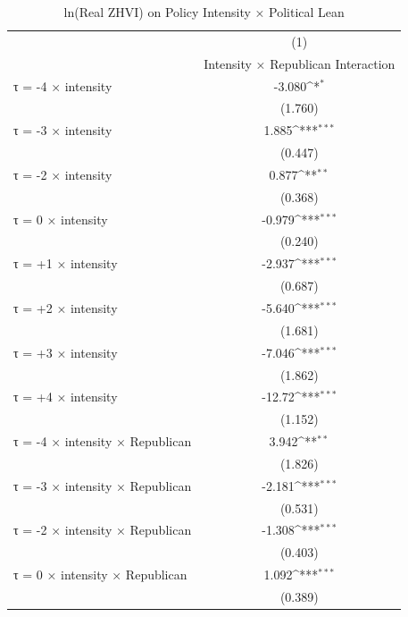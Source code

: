 \begin{table}[htbp]\centering
\def\sym#1{\ifmmode^{#1}\else\(^{#1}\)\fi}
\caption{ln(Real ZHVI) on Policy Intensity × Political Lean}
\begin{tabular}{l*{1}{c}}
\hline\hline
                    &\multicolumn{1}{c}{(1)}\\
                    &\multicolumn{1}{c}{Intensity × Republican Interaction}\\
\hline
τ = -4 × intensity  &      -3.080\sym{*}  \\
                    &     (1.760)         \\
[1em]
τ = -3 × intensity  &       1.885\sym{***}\\
                    &     (0.447)         \\
[1em]
τ = -2 × intensity  &       0.877\sym{**} \\
                    &     (0.368)         \\
[1em]
τ = 0 × intensity   &      -0.979\sym{***}\\
                    &     (0.240)         \\
[1em]
τ = +1 × intensity  &      -2.937\sym{***}\\
                    &     (0.687)         \\
[1em]
τ = +2 × intensity  &      -5.640\sym{***}\\
                    &     (1.681)         \\
[1em]
τ = +3 × intensity  &      -7.046\sym{***}\\
                    &     (1.862)         \\
[1em]
τ = +4 × intensity  &      -12.72\sym{***}\\
                    &     (1.152)         \\
[1em]
τ = -4 × intensity × Republican&       3.942\sym{**} \\
                    &     (1.826)         \\
[1em]
τ = -3 × intensity × Republican&      -2.181\sym{***}\\
                    &     (0.531)         \\
[1em]
τ = -2 × intensity × Republican&      -1.308\sym{***}\\
                    &     (0.403)         \\
[1em]
τ = 0 × intensity × Republican&       1.092\sym{***}\\
                    &     (0.389)         \\

\end{tabular}
\end{table}
